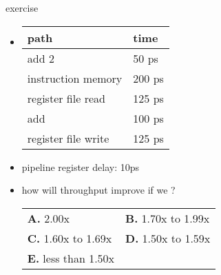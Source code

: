 \begin{frame}[fragile,label=timingEx]{exercise}
\vspace{-1cm}
\begin{itemize}
    \item
\begin{tabular}{ll}
path & time \\ \hline
add 2 & 50 ps \\
instruction memory & 200 ps \\
register file read & 125 ps \\
add & 100 ps \\
register file write & 125 ps \\
\end{tabular}
\item pipeline register delay: 10ps
\item how will throughput improve if we ? \\
    \begin{tabular}{ll}
        \textbf{A.} 2.00x & \textbf{B.} 1.70x to 1.99x \\
        \textbf{C.} 1.60x to 1.69x & \textbf{D.} 1.50x to 1.59x \\
        \textbf{E.} less than 1.50x & ~\\
    \end{tabular}
\end{itemize}
\end{frame}
